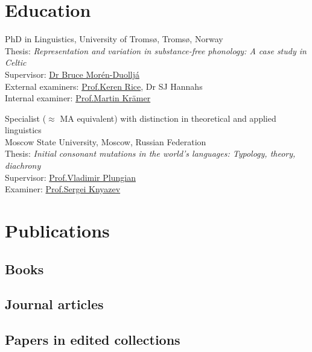 \documentclass[a4paper,12pt]{article}
\newcommand\cvitem[1]{#1\par}
\newcommand{\block}[2]{\hspace{0pt}\marginpar{\plmarginyear{#1}}\cvitem{#2}}
\renewcommand*\plmarginyear[1]{%
\raggedleft\small\textdemibold{#1}%
}
\begin{document}
\section{Education}

\block{2007--2012}{PhD in Linguistics, University of Tromsø, Tromsø, Norway\\
Thesis: \emph{Representation and variation in substance-free phonology: A case study in Celtic}\\
Supervisor: \href{https://arran.no/nord/?Article=110}{Dr Bruce Morén-Duolljá}\\
External examiners: \href{http://linguistics.utoronto.ca/people/faculty.html}{Prof.\@ Keren Rice}, Dr SJ Hannahs\\
Internal examiner: \href{https://uit.no/om/enhet/ansatte/person?p_document_id=41560\&p_dimension_id=210121}{Prof.\@ Martin Krämer}}
\block{2002--2007}{Specialist ($\approx$ MA equivalent) with distinction in theoretical and applied linguistics\\
Moscow State University, Moscow, Russian Federation\\
Thesis: \emph{Initial consonant mutations in the world's languages: Typology,  theory, diachrony}\\
Supervisor: \href{https://iling-ran.ru/web/scholars/plungian}{Prof.\@ Vladimir Plungian}\\
Examiner: \href{http://www.philol.msu.ru/~ruslang/about/employee/knyazev.s.v/}{Prof.\@ Sergei Knyazev}}


\section{Publications}

\subsection*{Books}
\newrefsection[books]
\nocite{*}
\printbibliography[heading=none]

\nocite{*}

\subsection*{Journal articles}
\printbibliography[heading=none, notkeyword=future]

\subsection*{Papers in edited collections}
\newrefsection[chapters]
\nocite{*}
\printbibliography[heading=none, notkeyword=future]
\end{document}
